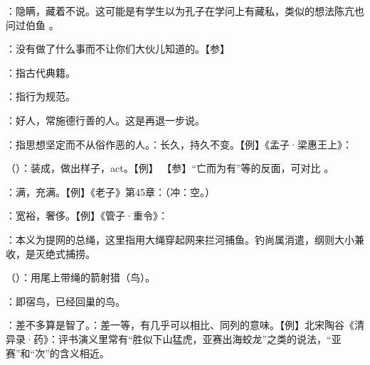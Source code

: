 {
\item {}：隐瞒，藏着不说。这可能是有学生以为孔子在学问上有藏私，类似的想法陈亢也问过伯鱼 。
\item {}：没有做了什么事而不让你们大伙儿知道的。【参】
}
{}


{
\item {}：指古代典籍。
\item {}：指行为规范。
}
{}


{
\item {}：好人，常施德行善的人。这是再退一步说。
\item {}：指思想坚定而不从俗作恶的人。：长久，持久不变。【例】《孟子·梁惠王上》：
\item {}（）：装成，做出样子，act。【例】   【参】“亡而为有”等的反面，可对比 。
\item {}：满，充满。【例】《老子》第45章：（冲：空。）
\item {}：宽裕，奢侈。【例】《管子·重令》：
}
{}


{
\item {}：本义为提网的总绳，这里指用大绳穿起网来拦河捕鱼。钓尚属消遣，纲则大小兼收，是灭绝式捕捞。
\item {}（）：用尾上带绳的箭射猎（鸟）。
\item {}：即宿鸟，已经回巢的鸟。
}
{}



{
\item {}：差不多算是智了。：差一等，有几乎可以相比、同列的意味。【例】北宋陶谷《清异录·药》：评书演义里常有“胜似下山猛虎，亚赛出海蛟龙”之类的说法，“亚赛”和“次”的含义相近。
}
{}  %


